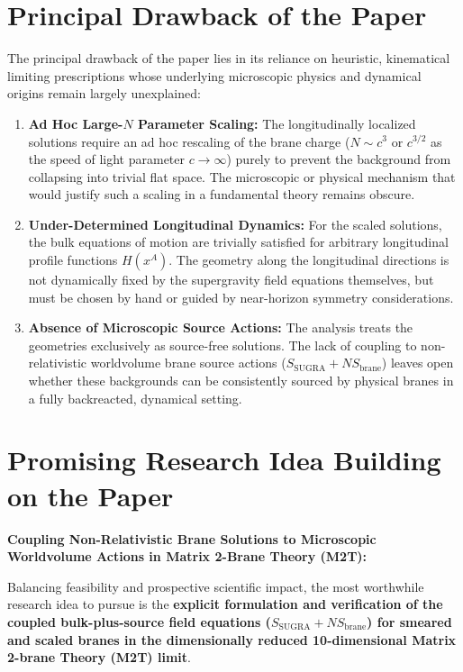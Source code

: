 \documentclass[11pt,a4paper]{article}
\begin{document}
\section{Principal Drawback of the Paper}
The principal drawback of the paper lies in its reliance on heuristic, kinematical limiting prescriptions whose underlying microscopic physics and dynamical origins remain largely unexplained:
\begin{enumerate}
    \item \textbf{Ad Hoc Large-$N$ Parameter Scaling:} 
    The longitudinally localized solutions require an ad hoc rescaling of the brane charge ($N \sim c^3$ or $c^{3/2}$ as the speed of light parameter $c \to \infty$) purely to prevent the background from collapsing into trivial flat space. The microscopic or physical mechanism that would justify such a scaling in a fundamental theory remains obscure.
    
    \item \textbf{Under-Determined Longitudinal Dynamics:} 
    For the scaled solutions, the bulk equations of motion are trivially satisfied for arbitrary longitudinal profile functions $H(x^A)$. The geometry along the longitudinal directions is not dynamically fixed by the supergravity field equations themselves, but must be chosen by hand or guided by near-horizon symmetry considerations.
    
    \item \textbf{Absence of Microscopic Source Actions:} 
    The analysis treats the geometries exclusively as source-free solutions. The lack of coupling to non-relativistic worldvolume brane source actions ($S_{\mathrm{SUGRA}} + N S_{\mathrm{brane}}$) leaves open whether these backgrounds can be consistently sourced by physical branes in a fully backreacted, dynamical setting.
\end{enumerate}

\section{Promising Research Idea Building on the Paper}
\textbf{Coupling Non-Relativistic Brane Solutions to Microscopic Worldvolume Actions in Matrix 2-Brane Theory (M2T):}

Balancing feasibility and prospective scientific impact, the most worthwhile research idea to pursue is the \textbf{explicit formulation and verification of the coupled bulk-plus-source field equations ($S_{\mathrm{SUGRA}} + N S_{\mathrm{brane}}$) for smeared and scaled branes in the dimensionally reduced 10-dimensional Matrix 2-brane Theory (M2T) limit}.
\end{document}
